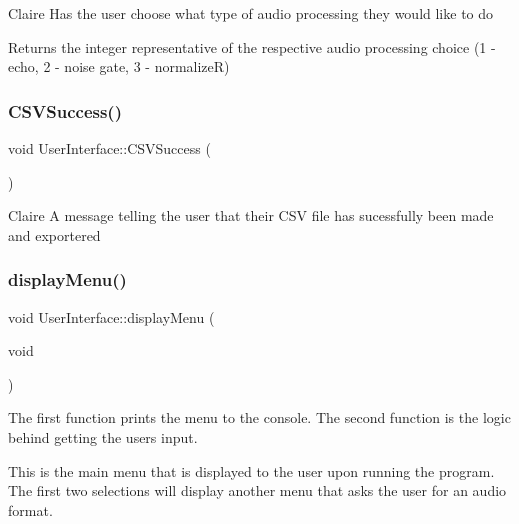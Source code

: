 Claire Has the user choose what type of audio processing they would like to do \begin{DoxyReturn}{Returns}
the integer representative of the respective audio processing choice (1 -\/ echo, 2 -\/ noise gate, 3 -\/ normalizeR) 
\end{DoxyReturn}
\mbox{\label{classUserInterface_a2280ccd4003f2de2ace9ca1dd388d394}} 
\subsubsection{\texorpdfstring{C\+S\+V\+Success()}{CSVSuccess()}}
{\footnotesize\ttfamily void User\+Interface\+::\+C\+S\+V\+Success (\begin{DoxyParamCaption}{ }\end{DoxyParamCaption})}

Claire A message telling the user that their C\+SV file has sucessfully been made and exportered \mbox{\label{classUserInterface_a5145df77b2081085c4ecb264eb718870}} 
\subsubsection{\texorpdfstring{display\+Menu()}{displayMenu()}}
{\footnotesize\ttfamily void User\+Interface\+::display\+Menu (\begin{DoxyParamCaption}\item[{void}]{ }\end{DoxyParamCaption})}

The first function prints the menu to the console. The second function is the logic behind getting the user\textquotesingle{}s input.

This is the main menu that is displayed to the user upon running the program. The first two selections will display another menu that asks the user for an audio format. \mbox{\label{classUserInterface_ac78627be5f915f61d87bec9abe6da205}} 
